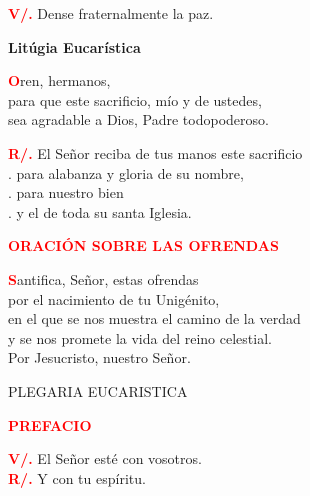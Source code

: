 \documentclass[12pt, letterpaper]{report}
\begin{document}
  \Large \hspace{-0.9cm} {\bfseries \textcolor{red}{V/.}} \hspace{0.5cm} Dense fraternalmente la paz.

  \begin{center}
    \Huge {\bfseries Lit\'ugia Eucar\'istica}
  \end{center}

  \lettrine[lines=2]{\bfseries \textcolor{red}{O}}{}\Large ren, hermanos, \\
  para que este sacrificio, m\'io y de ustedes, \\
  sea agradable a Dios, Padre todopoderoso.

  \Large \hspace{-0.9cm} {\bfseries \textcolor{red}{R/.}} \hspace{0.5cm} El Se\~nor reciba de tus manos este sacrificio \\
  . \hspace{1cm} para alabanza y gloria de su nombre, \\
  . \hspace{1cm} para nuestro bien \\
  . \hspace{1cm} y el de toda su santa Iglesia.

  \Large {\bfseries \textcolor{red}{ORACI\'ON SOBRE LAS OFRENDAS}}

  \lettrine[lines=2]{\bfseries \textcolor{red}{S}}{}\Large antifica, Se\~nor, estas ofrendas \\
  por el nacimiento de tu Unig\'enito, \\
  en el que se nos muestra el camino de la verdad \\
  y se nos promete la vida del reino celestial. \\
  Por Jesucristo, nuestro Se\~nor.
  
  \clearpage

  \begin{center}
    \Large PLEGARIA EUCARISTICA
  \end{center}

  \Large {\bfseries \textcolor{red}{PREFACIO}}

  \Large \hspace{-0.9cm} {\bfseries \textcolor{red}{V/.}} \hspace{0.5cm} El Se\~nor est\'e con vosotros.\\
  \Large \hspace{-0.9cm} {\bfseries \textcolor{red}{R/.}} \hspace{0.5cm} Y con tu esp\'iritu.
\end{document}
